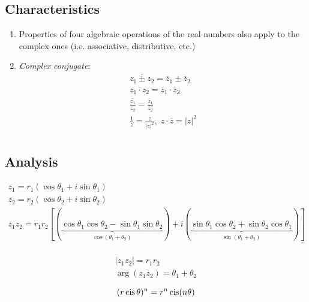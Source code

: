 \documentclass[00_complete]{subfiles}
\begin{document}
\subsection{Characteristics}

\begin{enumerate}
\item
  Properties of four algebraic operations of the real numbers also apply
  to the complex ones (i.e. associative, distributive, etc.)
\item
  \emph{Complex conjugate}: \[
  \begin{gathered}
   \overline{z_1 \pm z_2} = \overline z_1 \pm \overline z_2 \\
   \overline{z_1 \cdot z_2} = \overline z_1 \cdot \overline z_2 \\
   \overline{\frac{z_1}{z_2}} = \frac{\overline z_1}{\overline z_2} \\
   \frac{1}{z}=\frac{\overline z}{|z|^2}, \; z \cdot \overline z  = |z|^2 \\
  \end{gathered}
  \]
\end{enumerate}

\subsection{Analysis}

\[
\begin{gathered}
    z_1 = r_1(\cos \theta_1 + i \sin \theta_1) \\
    z_2 = r_2(\cos \theta_2 + i \sin \theta_2) \\
    z_1 z_2= r_1 r_2 [
        (\underbrace{\cos \theta_1 \cos \theta_2 - \sin \theta_1 \sin\theta_2}
            _{\cos (\theta_1 + \theta_2)})
        +i(\underbrace{\sin \theta_1 \cos \theta_2 + \sin \theta_2 \cos \theta_1}
            _{\sin(\theta_1 + \theta_2)})
    ] \\
\end{gathered}
\]

\begin{conclusion}
\[
\begin{gathered}
    |z_1 z_2| = r_1 r_2 \\
    \arg(z_1 z_2) = \theta_1 + \theta_2
\end{gathered}
\]
\end{conclusion}

\begin{definition}
\[
(r \operatorname{cis}\theta)^n=r^n \operatorname{cis}(n \theta)
\]
\end{definition}
\end{document}
